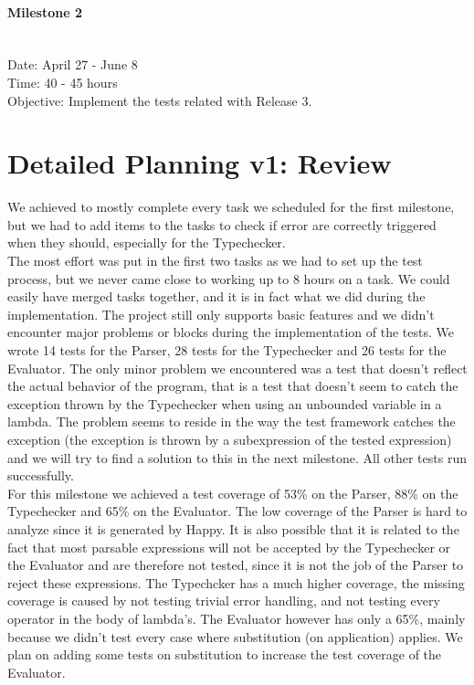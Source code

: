 \documentclass[pdftex,11pt,a4paper]{article}
\begin{document}
\paragraph{Milestone 2} \mbox{}\\
Date: April 27 - June 8\\
Time: 40 - 45 hours\\
Objective: Implement the tests related with Release 3.


\section{Detailed Planning v1: Review}

We achieved to mostly complete every task we scheduled for the first milestone, but we had to add items to the tasks to check if error are correctly triggered when they should, especially for the Typechecker.\\ 
The most effort was put in the first two tasks as we had to set up the test process, but we never came close to working up to 8 hours on a task. We could easily have merged tasks together, and it is in fact what we did during the implementation.
The project still only supports basic features and we didn't encounter major problems or blocks during the implementation of the tests. We wrote 14 tests for the Parser, 28 tests for the Typechecker and 26 tests for the Evaluator. 
The only minor problem we encountered was a test that doesn't reflect the actual behavior of the program, that is a test that doesn't seem to catch the exception thrown by the Typechecker when using an unbounded variable in a lambda. 
The problem seems to reside in the way the test framework catches the exception (the exception is thrown by a subexpression of the tested expression) and we will try to find a solution to this in the next milestone. All other tests run successfully. \\
For this milestone we achieved a test coverage of 53\% on the Parser, 88\% on the Typechecker and 65\% on the Evaluator. The low coverage of the Parser is hard to analyze since it is generated by Happy. 
It is also possible that it is related to the fact that most parsable expressions will not be accepted by the Typechecker or the Evaluator and are therefore not tested, since it is not the job of the Parser to reject these expressions.
The Typechcker has a much higher coverage, the missing coverage is caused by not testing trivial error handling, and not testing every operator in the body of lambda's. The Evaluator however has only a 65\%, mainly because we didn't test
every case where substitution (on application) applies. We plan on adding some tests on substitution to increase the test coverage of the Evaluator.
\end{document}
